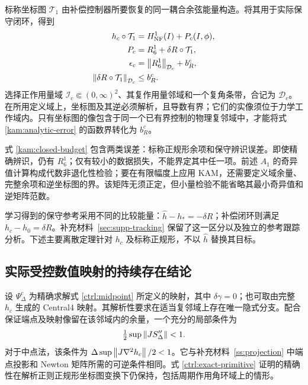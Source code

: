 标称坐标图 $\mathcal T_1$ 由补偿控制器所要恢复的同一耦合余弦能量构造。将其用于实际保守闭环，得到
\begin{equation}\label{kam:closed-budget}
\begin{aligned}
 h_c\circ\mathcal T_1
    &=H_{\rm NF}^{1}(I)+P_c(I,\phi),\\
 P_c&=R_6^{1}+\delta R\circ\mathcal T_1,\\
 \epsilon_c&=\left\lVert R_6^{1}\right\rVert_{\mathcal D_c}+b_R^c,\\
 \left\lVert\delta R\circ\mathcal T_1\right\rVert_{\mathcal D_c}&\le b_R^c.
\end{aligned}
\end{equation}
选择正作用量域 $\mathcal I_c\Subset(0,\infty)^2$、其复作用量邻域和一个复角条带，合记为 $\mathcal D_c$。在所用定义域上，坐标图及其逆必须解析，且导数有界；它们的实像须位于力学工作域内。只有坐标图的像包含于同一个已有界控制的物理复邻域中，才能将式 \eqref{kam:analytic-error} 的函数界转化为 $b_R^c$。

式 \eqref{kam:closed-budget} 包含两类误差：标称正规形余项和保守辨识误差。即使精确辨识，仍有 $R_6^1$；仅有较小的数据损失，不能界定其中任一项。前述 $A_1$ 的奇异值计算构成代数非退化性检验；要在有限幅度上应用 KAM，还需要定义域余量、完整余项和逆坐标图的界。该矩阵无须正定，但小量检验不能省略其最小奇异值和逆矩阵范数。

学习得到的保守参考采用不同的比较能量：$\widehat h-h_*=-\delta R$；补偿闭环则满足 $h_c-h_0=\delta R$。补充材料~\ref{sec:supp-tracking} 保留了这一区分以及独立的参考跟踪分析。下述主要离散定理针对 $h_c$ 及标称正规形，不以 $\widehat h$ 替换其目标。

\subsection{实际受控数值映射的持续存在结论}
\label{kam:map-section}

设 $\Psi_\Delta^c$ 为精确求解式 \eqref{ctrl:midpoint} 所定义的映射，其中 $\delta\gamma=0$；也可取由完整 $h_c$ 生成的 Central4 映射。其解析性要求在适当复邻域上存在唯一隐式分支。配合保证端点及映射像留在该邻域内的余量，一个充分的局部条件为
\begin{equation}\label{kam:implicit-branch}
 \tfrac12\sup\left\lVert J S_\Delta''\right\rVert<1.
\end{equation}
对于中点法，该条件为 $\Delta\sup\left\lVert J\nabla^2h_c\right\rVert/2<1$。它与补充材料~\ref{ss:projection} 中端点投影和 Newton 矩阵所需的可逆条件相同。式 \eqref{ctrl:exact-primitive} 证明的精确性在解析正则正规形坐标图变换下仍保持，包括周期作用角环域上的情形。


